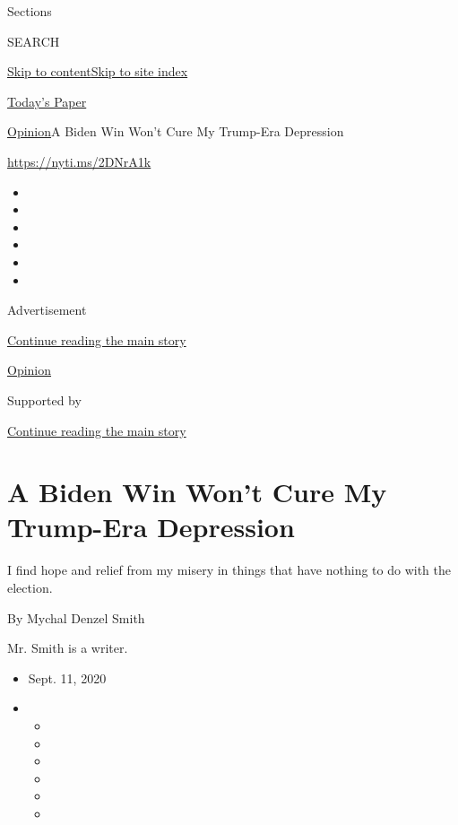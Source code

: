 Sections

SEARCH

\protect\hyperlink{site-content}{Skip to
content}\protect\hyperlink{site-index}{Skip to site index}

\href{https://myaccount.nytimes3xbfgragh.onion/auth/login?response_type=cookie\&client_id=vi}{}

\href{https://www.nytimes3xbfgragh.onion/section/todayspaper}{Today's
Paper}

\href{/section/opinion}{Opinion}\textbar{}A Biden Win Won't Cure My
Trump-Era Depression

\url{https://nyti.ms/2DNrA1k}

\begin{itemize}
\item
\item
\item
\item
\item
\item
\end{itemize}

Advertisement

\protect\hyperlink{after-top}{Continue reading the main story}

\href{/section/opinion}{Opinion}

Supported by

\protect\hyperlink{after-sponsor}{Continue reading the main story}

\hypertarget{a-biden-win-wont-cure-my-trump-era-depression}{%
\section{A Biden Win Won't Cure My Trump-Era
Depression}\label{a-biden-win-wont-cure-my-trump-era-depression}}

I find hope and relief from my misery in things that have nothing to do
with the election.

By Mychal Denzel Smith

Mr. Smith is a writer.

\begin{itemize}
\item
  Sept. 11, 2020
\item
  \begin{itemize}
  \item
  \item
  \item
  \item
  \item
  \item
  \end{itemize}
\end{itemize}

